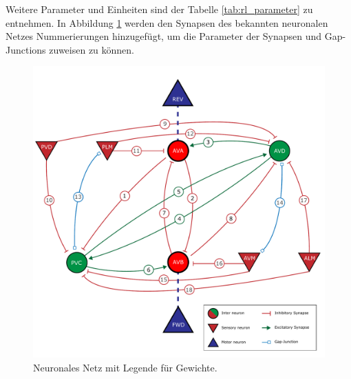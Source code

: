 	Weitere Parameter und Einheiten sind der Tabelle \ref{tab:rl_parameter} zu entnehmen. In Abbildung \ref{fig:erg_rs_flow} werden den Synapsen des bekannten neuronalen Netzes Nummerierungen hinzugefügt, um die Parameter der Synapsen und Gap-Junctions zuweisen zu können.
	\begin{figure}[H]
		\centering
		\includegraphics[width=12cm]{figures/appendix/Neural_Net_v3_num_syn.pdf}
		\caption{Neuronales Netz mit Legende für Gewichte.}
		\label{fig:erg_rs_flow}
	\end{figure}

